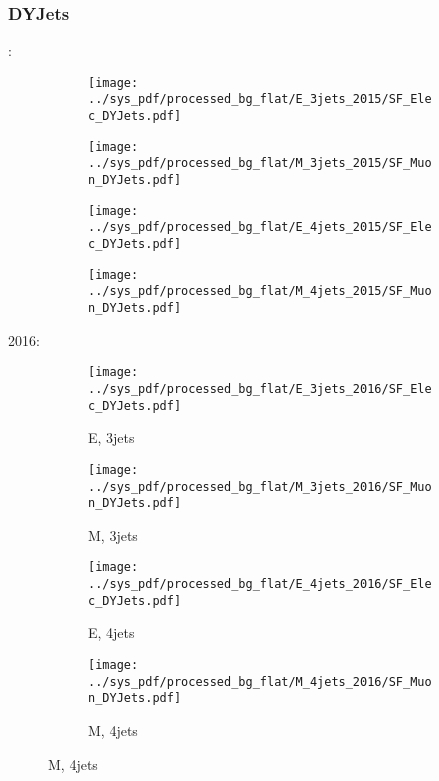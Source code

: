 \documentclass{beamer}
\begin{document}
\begin{frame}
\frametitle{DYJets}
\fontsize{5}{1}:
\begin{figure}
\centering
\begin{subfigure}[b]{0.24\textwidth}
\texttt{[image: ../sys\_pdf/processed\_bg\_flat/E\_3jets\_2015/SF\_Elec\_DYJets.pdf]}
\end{subfigure}
\begin{subfigure}[b]{0.24\textwidth}
\texttt{[image: ../sys\_pdf/processed\_bg\_flat/M\_3jets\_2015/SF\_Muon\_DYJets.pdf]}
\end{subfigure}
\begin{subfigure}[b]{0.24\textwidth}
\texttt{[image: ../sys\_pdf/processed\_bg\_flat/E\_4jets\_2015/SF\_Elec\_DYJets.pdf]}
\end{subfigure}
\begin{subfigure}[b]{0.24\textwidth}
\texttt{[image: ../sys\_pdf/processed\_bg\_flat/M\_4jets\_2015/SF\_Muon\_DYJets.pdf]}
\end{subfigure}
\end{figure}
2016:
\begin{figure}
\centering
\begin{subfigure}[b]{0.24\textwidth}
\texttt{[image: ../sys\_pdf/processed\_bg\_flat/E\_3jets\_2016/SF\_Elec\_DYJets.pdf]}
\captionsetup{font=tiny}
\caption{E, 3jets}
\end{subfigure}
\begin{subfigure}[b]{0.24\textwidth}
\texttt{[image: ../sys\_pdf/processed\_bg\_flat/M\_3jets\_2016/SF\_Muon\_DYJets.pdf]}
\captionsetup{font=tiny}
\caption{M, 3jets}
\end{subfigure}
\begin{subfigure}[b]{0.24\textwidth}
\texttt{[image: ../sys\_pdf/processed\_bg\_flat/E\_4jets\_2016/SF\_Elec\_DYJets.pdf]}
\captionsetup{font=tiny}
\caption{E, 4jets}
\end{subfigure}
\begin{subfigure}[b]{0.24\textwidth}
\texttt{[image: ../sys\_pdf/processed\_bg\_flat/M\_4jets\_2016/SF\_Muon\_DYJets.pdf]}
\captionsetup{font=tiny}
\caption{M, 4jets}
\end{subfigure}
\end{figure}
\end{frame}
\end{document}
